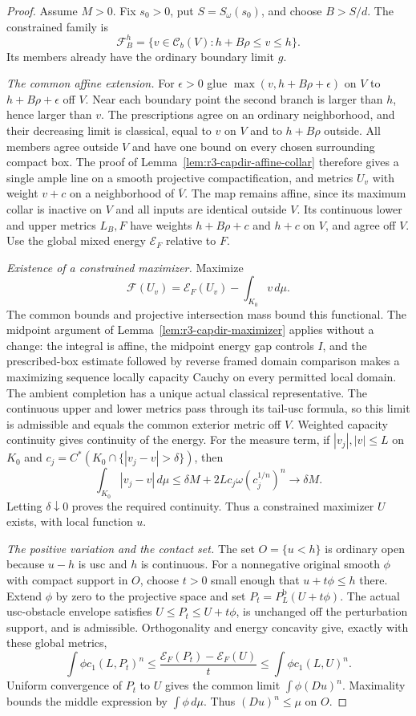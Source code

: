 \documentclass[11pt,a4paper]{article}
\numberwithin{equation}{section}
\theoremstyle{definition}
\theoremstyle{remark}
\newcommand{\Cb}{\mathcal C_b}
\begin{document}
\begin{proof}
Assume $M>0$. Fix $s_0>0$, put $S=S_\omega(s_0)$, and choose
$B>S/d$. The constrained family is
\[
 \mathcal F_B^h=\{v\in\Cb(V):h+B\rho\leq v\leq h\}.
\]
Its members already have the ordinary boundary limit $g$.

\emph{The common affine extension.}
For $\epsilon>0$ glue $\max(v,h+B\rho+\epsilon)$ on $V$
to $h+B\rho+\epsilon$ off $V$. Near each boundary point the
second branch is larger than $h$, hence larger than $v$.
The prescriptions agree on an ordinary neighborhood, and their
decreasing limit is classical, equal to $v$ on $V$ and to
$h+B\rho$ outside. All members agree outside $V$ and have one
bound on every chosen surrounding compact box. The proof of
Lemma~\ref{lem:r3-capdir-affine-collar} therefore gives a single
ample line on a smooth projective compactification, and metrics
$U_v$ with weight $v+c$ on a neighborhood of $\overline V$.
The map remains affine, since its maximum collar is inactive
on $V$ and all inputs are identical outside $V$. Its continuous
lower and upper metrics $L_B,F$ have weights $h+B\rho+c$ and
$h+c$ on $V$, and agree off $V$. Use the global mixed energy
$\mathcal E_F$ relative to $F$.

\emph{Existence of a constrained maximizer.}
Maximize
\[
 \mathcal F(U_v)=\mathcal E_F(U_v)-\int_{K_0}v\,d\mu.
\]
The common bounds and projective intersection mass bound this
functional. The midpoint argument of
Lemma~\ref{lem:r3-capdir-maximizer} applies without a change:
the integral is affine, the midpoint energy gap controls $I$,
and the prescribed-box estimate followed by reverse framed domain
comparison makes a maximizing sequence locally capacity Cauchy
on every permitted local domain. The ambient completion has a
unique actual classical representative. The continuous upper and
lower metrics pass through its tail-usc formula, so this limit
is admissible and equals the common exterior metric off $V$.
Weighted capacity continuity gives continuity of the energy.
For the measure term, if $|v_j|,|v|\leq L$ on $K_0$ and
$c_j=C^*(K_0\cap\{|v_j-v|>\delta\})$, then
\[
 \int_{K_0}|v_j-v|\,d\mu
 \leq\delta M+2L c_j\omega(c_j^{1/n})^n\longrightarrow\delta M.
\]
Letting $\delta\downarrow0$ proves the required continuity.
Thus a constrained maximizer $U$ exists, with local function $u$.

\emph{The positive variation and the contact set.}
The set $O=\{u<h\}$ is ordinary open because $u-h$ is usc and
$h$ is continuous. For a nonnegative original smooth $\phi$
with compact support in $O$, choose $t>0$ small enough that
$u+t\phi\leq h$ there. Extend $\phi$ by zero to the projective
space and set $P_t=P_L^{\mathrm b}(U+t\phi)$. The actual
usc-obstacle envelope satisfies $U\leq P_t\leq U+t\phi$, is
unchanged off the perturbation support, and is admissible.
Orthogonality and energy concavity give, exactly with these
global metrics,
\[
 \int\phi c_1(L,P_t)^n
 \leq\frac{\mathcal E_F(P_t)-\mathcal E_F(U)}t
 \leq\int\phi c_1(L,U)^n.
\]
Uniform convergence of $P_t$ to $U$ gives the common limit
$\int\phi(Du)^n$. Maximality bounds the middle expression by
$\int\phi\,d\mu$. Thus $(Du)^n\leq\mu$ on $O$.


\end{proof}
\end{document}
